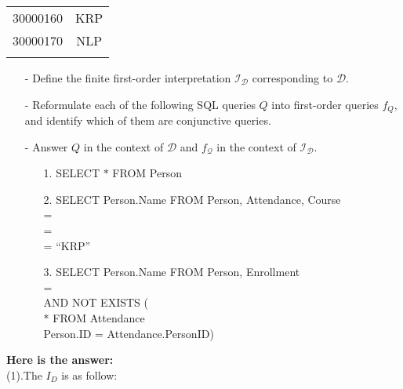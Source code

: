 \documentclass{article}
\begin{document}
\begin{table}[ht]
\begin{center}
{\begin{tabular}{|c|c|}
    \textsf{30000160}&  \textsf{KRP}\\
    
    \textsf{30000170}&  \textsf{NLP}\\
    
    &  \\
    \hline
    \end{tabular}
    }
    \end{center}
    \end{table}
    \begin{itemize}
        \item[-] Define the finite first-order interpretation $\mathcal{I}_{\mathcal{D}}$ corresponding to $\mathcal{D}$. 
        \item[-] Reformulate each of the following SQL queries $Q$ into first-order queries $f_{Q}$, and identify which of them are conjunctive queries.
        \item[-] Answer $Q$ in the context of $\mathcal{D}$ and $f_{\mathcal{Q}}$ in the context of $\mathcal{I}_{\mathcal{D}}$.
        \item[]\begin{itemize}
        \item[1.] \textsf{SELECT} $\ast$ \textsf{FROM} Person
        \item[2.] \textsf{SELECT} Person.Name \textsf{FROM} Person, Attendance, Course\\
            = \\
            = \\
            = ``\textsf{KRP}''
        \item[3.] \textsf{SELECT} Person.Name \textsf{FROM} Person, Enrollment\\
            = \\
           \textsf{AND NOT EXISTS (}\\
            $\ast$ \textsf{FROM} Attendance\\
            Person.ID = Attendance.PersonID\textsf{)}
    \end{itemize}
    \end{itemize}
    \textbf{Here is the answer:}\\
    (1).The $I_D$ is as follow:\\
\end{document}
